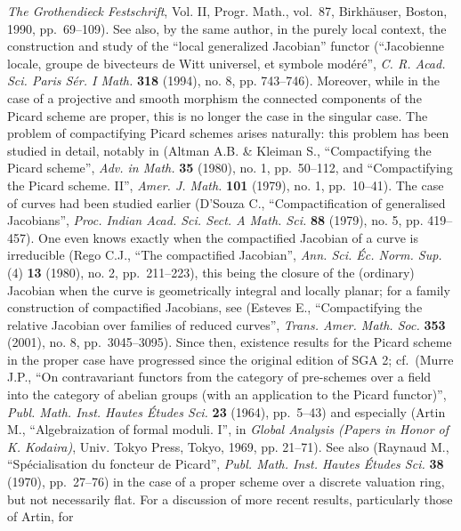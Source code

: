 \documentclass[
]{article}
\begin{document}
\begin{enumerate}
{    \emph{The Grothendieck Festschrift}, Vol. II, Progr. Math., vol.~87,
    Birkhäuser, Boston, 1990, pp.~69--109). See also, by the same
    author, in the purely local context, the construction and study of
    the ``local generalized Jacobian'' functor (``Jacobienne locale,
    groupe de bivecteurs de Witt universel, et symbole modéré'',
    \emph{C. R. Acad. Sci. Paris Sér. I Math.} \textbf{318} (1994), no.
    8, pp. 743--746). Moreover, while in the case of a projective and
    smooth morphism the connected components of the Picard scheme are
    proper, this is no longer the case in the singular case. The problem
    of compactifying Picard schemes arises naturally: this problem has
    been studied in detail, notably in (Altman A.B. \& Kleiman S.,
    ``Compactifying the Picard scheme'', \emph{Adv. in Math.}
    \textbf{35} (1980), no. 1, pp.~50--112, and ``Compactifying the
    Picard scheme. II'', \emph{Amer. J. Math.} \textbf{101} (1979), no.
    1, pp.~10--41). The case of curves had been studied earlier (D'Souza
    C., ``Compactification of generalised Jacobians'', \emph{Proc.
    Indian Acad. Sci. Sect. A Math. Sci.} \textbf{88} (1979), no. 5, pp.
    419--457). One even knows exactly when the compactified Jacobian of
    a curve is irreducible (Rego C.J., ``The compactified Jacobian'',
    \emph{Ann. Sci. Éc. Norm. Sup.} (4) \textbf{13} (1980), no. 2,
    pp.~211--223), this being the closure of the (ordinary) Jacobian
    when the curve is geometrically integral and locally planar; for a
    family construction of compactified Jacobians, see (Esteves E.,
    ``Compactifying the relative Jacobian over families of reduced
    curves'', \emph{Trans. Amer. Math. Soc.} \textbf{353} (2001), no. 8,
    pp.~3045--3095). Since then, existence results for the Picard scheme
    in the proper case have progressed since the original edition of SGA
    2; cf.~(Murre J.P., ``On contravariant functors from the category of
    pre-schemes over a field into the category of abelian groups (with
    an application to the Picard functor)'', \emph{Publ. Math. Inst.
    Hautes Études Sci.} \textbf{23} (1964), pp.~5--43) and especially
    (Artin M., ``Algebraization of formal moduli. I'', in \emph{Global
    Analysis (Papers in Honor of K. Kodaira)}, Univ. Tokyo Press, Tokyo,
    1969, pp. 21--71). See also (Raynaud M., ``Spécialisation du
    foncteur de Picard'', \emph{Publ. Math. Inst. Hautes Études Sci.}
    \textbf{38} (1970), pp.~27--76) in the case of a proper scheme over
    a discrete valuation ring, but not necessarily flat. For a
    discussion of more recent results, particularly those of Artin, for
}
\end{enumerate}
\end{document}
